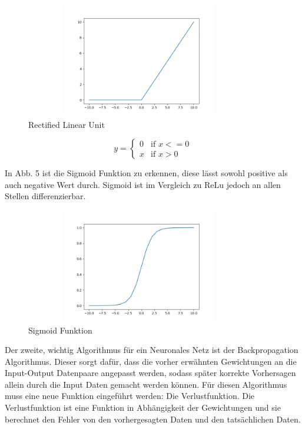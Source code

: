 \begin{figure}[H]
    \centering
    \includegraphics[height= 5cm, width = 10cm]{Pictures/Relu.png}
    \caption{Rectified Linear Unit}
\end{figure}



\[ y = \left\{ \begin{array}{ll}
         0 & \mbox{if $x <= 0$}\\
	        x & \mbox{if $x > 0$}\end{array} \right. \] 
	        
	        
	    


In Abb. 5 ist die Sigmoid Funktion zu erkennen, diese lässt sowohl positive als auch negative Wert durch. Sigmoid ist  im Vergleich zu ReLu jedoch an allen Stellen differenzierbar. 
    
\begin{figure}[H]
    \centering
    \includegraphics[height= 5cm, width = 10cm]{Pictures/Sigmoid.png}
    \caption{Sigmoid Funktion}
\end{figure}

Der zweite, wichtig Algorithmus für ein Neuronales Netz ist der Backpropagation Algorithmus. Dieser sorgt dafür, dass die vorher erwähnten Gewichtungen an die Input-Output Datenpaare angepasst werden, sodass später korrekte Vorhersagen allein durch die Input Daten gemacht werden können. Für diesen Algorithmus muss eine neue Funktion eingeführt werden: Die Verlustfunktion. Die Verlustfunktion ist eine Funktion in Abhängigkeit der Gewichtungen und sie berechnet den Fehler von den vorhergesagten Daten und den tatsächlichen Daten.

